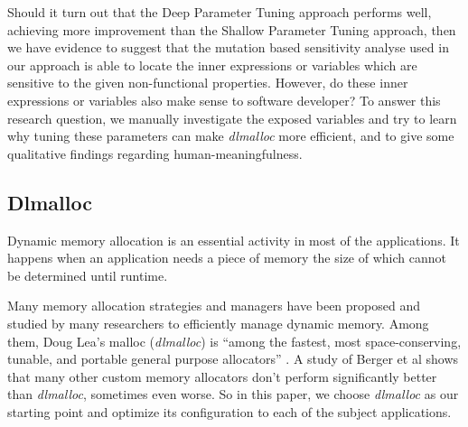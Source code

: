 Should it turn out that the Deep Parameter Tuning approach performs well, achieving more improvement than the Shallow Parameter Tuning approach, then we have evidence to suggest that the mutation based sensitivity analyse used in our approach is able to locate the inner expressions or variables which are sensitive to the given non-functional properties. However, do these inner expressions or variables also make sense to software developer? To answer this research question, we manually investigate the exposed variables and try to learn why tuning these parameters can make \emph{dlmalloc} more efficient, and to give some qualitative findings regarding human-meaningfulness.


\subsection{Dlmalloc}

Dynamic memory allocation is an essential activity in most of the applications. It happens when an application needs a piece of memory the size of which cannot be determined until runtime.


Many memory allocation strategies and managers have been proposed and studied by many researchers to efficiently manage dynamic memory. Among them, Doug Lea's malloc (\emph{dlmalloc}) is ``among the fastest, most space-conserving, tunable, and portable general purpose allocators'' \cite{lea1996memory}. A study of Berger et al \cite{Berger:2002:RCM:583854.582421} shows that many other custom memory allocators don't perform significantly better than \emph{dlmalloc}, sometimes even worse. So in this paper, we choose \emph{dlmalloc} as our starting point and optimize its configuration to each of the subject applications.


